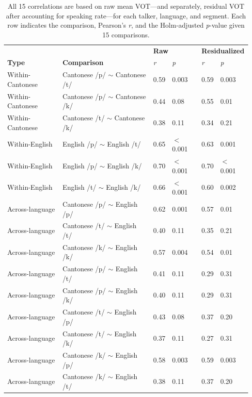 \begin{table}[htbp]
  \caption{All 15 correlations are based on raw mean VOT---and separately, residual VOT after accounting for speaking rate---for each talker, language, and segment. Each row indicates the comparison, Pearson's \textit{r}, and the Holm-adjusted \textit{p}-value given 15 comparisons.}
    \label{ch4:tab:correlations}
    \centering 
    \footnotesize
    \begin{tabular}{ll|ll|ll}
      \toprule
      &   & \multicolumn{2}{l|}{\textbf{Raw}} & \multicolumn{2}{l}{\textbf{Residualized}} \\
      \textbf{Type}   & \textbf{Comparison}  & \textit{r} & \textit{p} & \textit{r} & \textit{p}  \\
    \midrule
    Within-Cantonese  & Cantonese /p/ $\sim$ Cantonese /t/    & 0.59    & 0.003       & 0.59   & 0.003    \\
    Within-Cantonese  & Cantonese /p/ $\sim$ Cantonese /k/    & 0.44    & 0.08        & 0.55   & 0.01     \\
    Within-Cantonese  & Cantonese /t/ $\sim$ Cantonese /k/    & 0.38    & 0.11        & 0.34   & 0.21     \\
    \midrule
    Within-English    & English /p/   $\sim$  English /t/     & 0.65    & $<$0.001    & 0.63   & 0.001    \\
    Within-English    & English /p/   $\sim$  English /k/     & 0.70    & $<$0.001    & 0.70   & $<$0.001 \\
    Within-English    & English /t/   $\sim$  English /k/     & 0.66    & $<$0.001    & 0.60   & 0.002    \\
    \midrule
    Across-language   & Cantonese /p/  $\sim$ English /p/     & 0.62    & 0.001       & 0.57   & 0.01    \\
    Across-language   & Cantonese /t/  $\sim$ English /t/     & 0.40    & 0.11        & 0.35   & 0.21    \\
    Across-language   & Cantonese /k/  $\sim$ English /k/     & 0.57    & 0.004       & 0.54   & 0.01    \\
    \midrule
    Across-language   & Cantonese /p/  $\sim$ English /t/     & 0.41    & 0.11        & 0.29   & 0.31    \\
    Across-language   & Cantonese /p/  $\sim$ English /k/     & 0.40    & 0.11        & 0.29   & 0.31    \\
    Across-language   & Cantonese /t/  $\sim$ English /p/     & 0.43    & 0.08        & 0.37   & 0.20    \\
    Across-language   & Cantonese /t/  $\sim$ English /k/     & 0.37    & 0.11        & 0.27   & 0.31    \\
    Across-language   & Cantonese /k/  $\sim$ English /p/     & 0.58    & 0.003       & 0.59   & 0.003   \\
    Across-language   & Cantonese /k/  $\sim$ English /t/     & 0.38    & 0.11        & 0.37   & 0.20    \\
    \bottomrule
    \end{tabular}
\end{table}

